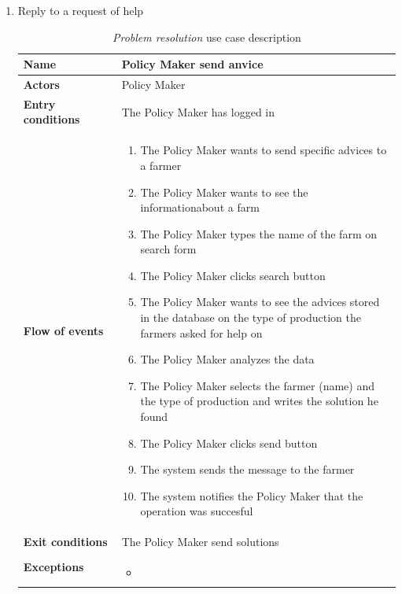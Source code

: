 \begin{enumerate}
    \item Reply to a request of help
    \begin{longtable}{p{0.26\linewidth}p{0.75\linewidth}}
        \toprule
        \textbf{Name} & \textbf{Policy Maker send anvice} \\
        \midrule
        \textbf{Actors} & Policy Maker \\
        \midrule
        \textbf{Entry conditions} & The Policy Maker has logged in\\
        \midrule
        \textbf{Flow of events} & 
        \begin{enumerate}
            \item The Policy Maker wants to send specific advices to a farmer
            \item The Policy Maker wants to see the informationabout a farm
            \item The Policy Maker types the name of the farm on search form
            \item The Policy Maker clicks search button 
            \item The Policy Maker wants to see the advices stored in the database on the type of production the farmers asked for help on
            \item The Policy Maker analyzes the data 
            \item The Policy Maker selects the farmer (name) and the type of production and writes the solution he found
            \item The Policy Maker clicks send button
            \item The system sends the message to the farmer
            \item The system notifies the Policy Maker that the operation was succesful
        \end{enumerate} \\
        \midrule
        \textbf{Exit conditions} & The Policy Maker send solutions\\
        \midrule
        \textbf{Exceptions} & 
        \begin{itemize}
            \item 
        \end{itemize}\\
        \bottomrule
        \caption{\emph{Problem resolution} use case description}
    \end{longtable}
    \begin{figure}[H]
        \begin{center}

\end{center}
\end{figure}
\end{enumerate}
